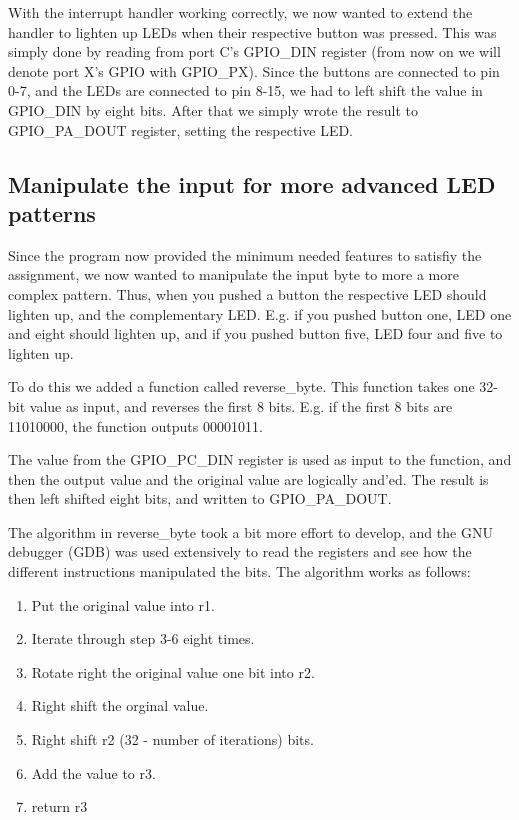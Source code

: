 With the interrupt handler working correctly, we now wanted to extend the handler to lighten up LEDs when their respective button was pressed. This was simply done by reading from port C's GPIO\_DIN register (from now on we will denote port X's GPIO with GPIO\_PX). Since the buttons are connected to pin
0-7, and the LEDs are connected to pin 8-15, we had to left shift the value in GPIO\_DIN by eight bits. After that we simply wrote the result to GPIO\_PA\_DOUT register, setting the respective LED. 

\subsection{Manipulate the input for more advanced LED patterns}

Since the program now provided the minimum needed features to satisfiy the assignment, we now wanted to manipulate the input byte to more a more complex pattern. Thus, when you pushed a button the respective LED should lighten up, and the complementary LED. E.g. if you pushed button one, LED one and eight should lighten up, and if you pushed button five, LED four and five to lighten up. 

To do this we added a function called reverse\_byte. This function takes one 32-bit value as input, and reverses the first 8 bits. E.g. if the first 8 bits are 11010000, the function outputs 00001011. 

The value from the GPIO\_PC\_DIN register is used as input to the function, and then the output value and the original value are logically and'ed. The result is then left shifted eight bits, and written to GPIO\_PA\_DOUT. 

The algorithm in reverse\_byte took a bit more effort to develop, and the GNU debugger (GDB) was used extensively to read the registers and see how the different instructions manipulated the bits. The algorithm works as follows:

\begin{enumerate}
	\item Put the original value into r1.
	\item Iterate through step 3-6 eight times.
	\item Rotate right the original value one bit into r2.
	\item Right shift the orginal value.
	\item Right shift r2 (32 - number of iterations) bits.
	\item Add the value to r3.
	\item return r3
\end{enumerate}

